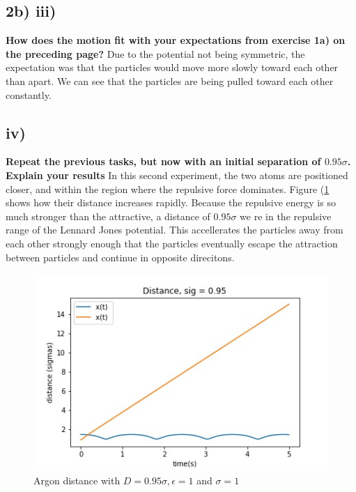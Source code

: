 \subsection*{2b) iii)}
\textbf{How does the motion fit with your expectations from exercise 1a) on the preceding page?}
Due to the potential not being symmetric, the expectation was that the particles would move more slowly toward each other than apart. We can see that the particles are being pulled toward each other constantly. 

\subsection*{iv)}
\textbf{Repeat the previous tasks, but now with an initial separation of $0.95 \sigma$. Explain your results}
In this second experiment, the two atoms are positioned closer, and within the region where the repulsive force dominates. Figure  (\ref{fig:two-particle-distance-095} shows how their distance increases rapidly. Because the repulsive energy is so much stronger than the attractive, a distance of $0.95\sigma$ we re in the repulsive range of the Lennard Jones potential. This accellerates the particles away from each other strongly enough that the particles eventually escape the attraction between particles and continue in opposite direcitons. 

\begin{figure}[h!]
        \centering 
        \includegraphics[scale=0.8]{./py/two-particle-distance-095.jpg} 
        \caption{Argon distance with $D = 0.95 \sigma, \epsilon = 1$ and $\sigma = 1$ }
        \label{fig:two-particle-distance-095}
\end{figure}



